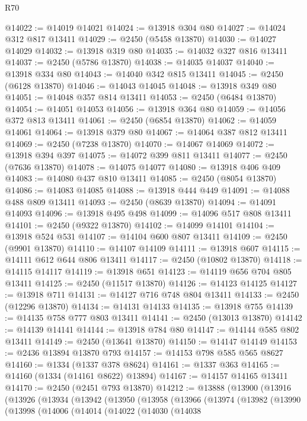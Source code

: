 \begin{lexlean}{R70}
\begin{coremodule}
@14022 := @14019 @14021
@14024 := @13918 @304 @80
@14027 := @14024 @312 @817 @13411
@14029 := @2450 (@5458 @13870)
@14030 := @14027 @14029
@14032 := @13918 @319 @80
@14035 := @14032 @327 @816 @13411
@14037 := @2450 (@5786 @13870)
@14038 := @14035 @14037
@14040 := @13918 @334 @80
@14043 := @14040 @342 @815 @13411
@14045 := @2450 (@6128 @13870)
@14046 := @14043 @14045
@14048 := @13918 @349 @80
@14051 := @14048 @357 @814 @13411
@14053 := @2450 (@6484 @13870)
@14054 := @14051 @14053
@14056 := @13918 @364 @80
@14059 := @14056 @372 @813 @13411
@14061 := @2450 (@6854 @13870)
@14062 := @14059 @14061
@14064 := @13918 @379 @80
@14067 := @14064 @387 @812 @13411
@14069 := @2450 (@7238 @13870)
@14070 := @14067 @14069
@14072 := @13918 @394 @397
@14075 := @14072 @399 @811 @13411
@14077 := @2450 (@7636 @13870)
@14078 := @14075 @14077
@14080 := @13918 @406 @409
@14083 := @14080 @437 @810 @13411
@14085 := @2450 (@8054 @13870)
@14086 := @14083 @14085
@14088 := @13918 @444 @449
@14091 := @14088 @488 @809 @13411
@14093 := @2450 (@8639 @13870)
@14094 := @14091 @14093
@14096 := @13918 @495 @498
@14099 := @14096 @517 @808 @13411
@14101 := @2450 (@9322 @13870)
@14102 := @14099 @14101
@14104 := @13918 @524 @531
@14107 := @14104 @600 @807 @13411
@14109 := @2450 (@9901 @13870)
@14110 := @14107 @14109
@14111 := @13918 @607
@14115 := @14111 @612 @644 @806 @13411
@14117 := @2450 (@10802 @13870)
@14118 := @14115 @14117
@14119 := @13918 @651
@14123 := @14119 @656 @704 @805 @13411
@14125 := @2450 (@11517 @13870)
@14126 := @14123 @14125
@14127 := @13918 @711
@14131 := @14127 @716 @748 @804 @13411
@14133 := @2450 (@12296 @13870)
@14134 := @14131 @14133
@14135 := @13918 @755
@14139 := @14135 @758 @777 @803 @13411
@14141 := @2450 (@13013 @13870)
@14142 := @14139 @14141
@14144 := @13918 @784 @80
@14147 := @14144 @585 @802 @13411
@14149 := @2450 (@13641 @13870)
@14150 := @14147 @14149
@14153 := @2436 @13894 @13870 @793
@14157 := @14153 @798 @585 @565 @8627
@14160 := @1334 (@1337 @378 @8624)
@14161 := @1337 @363
@14165 := @14160 (@1334 (@14161 @8622) @13894)
@14167 := @14157 @14165 @13411
@14170 := @2450 (@2451 @793 @13870)
@14212 := @13888
    (@13900
      (@13916
        (@13926
          (@13934
            (@13942
              (@13950
                (@13958
                  (@13966
                    (@13974
                      (@13982
                        (@13990
                          (@13998
                            (@14006
                              (@14014
                                (@14022
                                  (@14030
                                    (@14038

\end{coremodule}
\end{lexlean}
